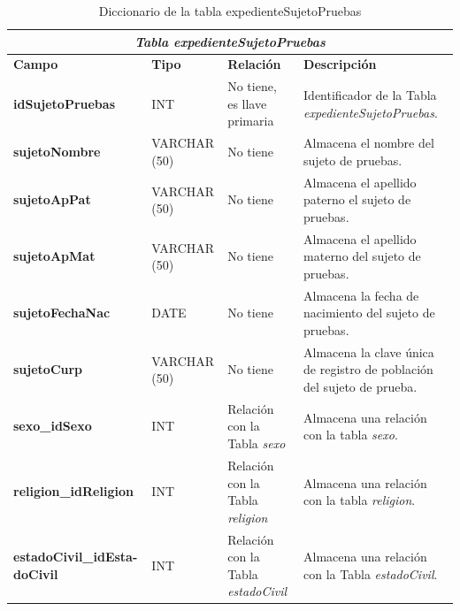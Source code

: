 \begin{table}[H]
\begin{center}
\begin{tabular}{||p{4cm}|p{}|p{}|p{5cm}||}
\hline
\multicolumn{4}{||c||}{\textit{\textbf{Tabla expedienteSujetoPruebas}}}\\
\hline 
\cellcolor{lightgray}\textbf{Campo} & \cellcolor{lightgray}\textbf{Tipo} & \cellcolor{lightgray}\textbf{Relación} & \cellcolor{lightgray}\textbf{Descripción} \\ \hline 
\textbf{idSujetoPruebas} & {INT} & {No tiene, es llave primaria} & {Identificador de la Tabla \textit{expedienteSujetoPruebas}.} \\ \hline
\textbf{sujetoNombre} & {VARCHAR (50)} & {No tiene} & {Almacena el nombre del sujeto de pruebas.} \\ \hline
\textbf{sujetoApPat} & {VARCHAR (50)} & {No tiene} & {Almacena el apellido paterno el sujeto de pruebas.} \\ \hline
\textbf{sujetoApMat} & {VARCHAR (50)} & {No tiene} & {Almacena el apellido materno del sujeto de pruebas.} \\ \hline
\textbf{sujetoFechaNac} & {DATE} & {No tiene} & {Almacena la fecha de nacimiento del sujeto de pruebas.} \\ \hline
\textbf{sujetoCurp} & {VARCHAR (50)} & {No tiene} & {Almacena la clave única de registro de población del sujeto de prueba.} \\ \hline
\textbf{sexo\_idSexo} & {INT} & {Relación con la Tabla \textit{sexo}} & {Almacena una relación con la tabla \textit{sexo}.} \\ \hline
\textbf{religion\_idReligion} & {INT} & {Relación con la Tabla \textit{religion}} & {Almacena una relación con la tabla \textit{religion}.} \\ \hline
\textbf{estadoCivil\_idEsta- doCivil} & {INT} & {Relación con la Tabla \textit{estadoCivil}} & {Almacena una relación con la Tabla \textit{estadoCivil}.} \\ \hline
\end{tabular}	
\caption{Diccionario de la tabla expedienteSujetoPruebas}
\label{Tabla:expedienteSujetoPruebas}
\end{center}
\end{table}


